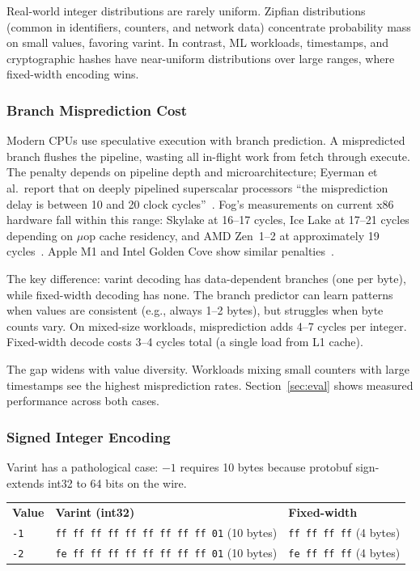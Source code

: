 \documentclass[11pt,onecolumn]{article}
\begin{document}
Real-world integer distributions are rarely uniform. Zipfian distributions (common in identifiers, counters, and network data) concentrate probability mass on small values, favoring varint. In contrast, ML workloads, timestamps, and cryptographic hashes have near-uniform distributions over large ranges, where fixed-width encoding wins.

\subsubsection{Branch Misprediction Cost}

Modern CPUs use speculative execution with branch prediction. A mispredicted branch flushes the pipeline, wasting all in-flight work from fetch through execute. The penalty depends on pipeline depth and microarchitecture; Eyerman et al.\ report that on deeply pipelined superscalar processors ``the misprediction delay is between 10 and 20 clock cycles''~\cite{eyerman-branch}. Fog's measurements on current x86 hardware fall within this range: Skylake at 16--17 cycles, Ice Lake at 17--21 cycles depending on $\mu$op cache residency, and AMD Zen~1--2 at approximately 19 cycles~\cite{fog-microarch}. Apple M1 and Intel Golden Cove show similar penalties~\cite{m1-bench, golden-cove}.

The key difference: varint decoding has data-dependent branches (one per byte), while fixed-width decoding has none. The branch predictor can learn patterns when values are consistent (e.g., always 1--2 bytes), but struggles when byte counts vary. On mixed-size workloads, misprediction adds 4--7 cycles per integer. Fixed-width decode costs 3--4 cycles total (a single load from L1 cache).

The gap widens with value diversity. Workloads mixing small counters with large timestamps see the highest misprediction rates. Section~\ref{sec:eval} shows measured performance across both cases.

\subsubsection{Signed Integer Encoding}

Varint has a pathological case: $-1$ requires 10 bytes because protobuf sign-extends int32 to 64 bits on the wire.

\vspace{6pt}
\begin{center}
\small
\begin{tabular}{@{}lll@{}}
\textbf{Value} & \textbf{Varint (int32)} & \textbf{Fixed-width} \\[4pt]
\texttt{-1} & \texttt{ff ff ff ff ff ff ff ff ff 01} (10 bytes) & \texttt{ff ff ff ff} (4 bytes) \\
\texttt{-2} & \texttt{fe ff ff ff ff ff ff ff ff 01} (10 bytes) & \texttt{fe ff ff ff} (4 bytes) \\
\end{tabular}
\end{center}
\vspace{6pt}
\end{document}
